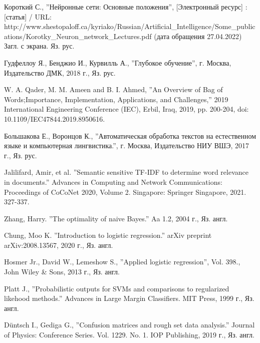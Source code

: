 \documentclass[bachelor, och, coursework]{SCWorks}
\begin{document}
\begin{thebibliography}{99}
     Короткий С., ''Нейронные сети: Основные положения'',
    [Электронный ресурс] : [статья] / URL:
    http://www.shestopaloff.ca/kyriako/Russian/Artificial_Intelligence/Some_publications/Korotky_Neuron_network_Lectures.pdf
    (дата обращения 27.04.2022) Загл. с экрана. Яз. рус.
    
     Гудфеллоу Я., Бенджио И., Курвилль А., ''Глубокое обучение'',
    г. Москва, Издательство ДМК, 2018 г., Яз. рус.
    
     W. A. Qader, M. M. Ameen and B. I. Ahmed, ''An Overview of Bag
    of Words;Importance, Implementation, Applications, and Challenges,'' 2019
    International Engineering Conference (IEC), Erbil, Iraq, 2019, pp. 200-204,
    doi: 10.1109/IEC47844.2019.8950616.


     Большакова Е., Воронцов К., ''Автоматическая обработка
    текстов на естественном языке и компьютерная лингвистика.'', г. Москва,
    Издательство НИУ ВШЭ, 2017 г., Яз. рус.

     Jalilifard, Amir, et al. ''Semantic sensitive TF-IDF to
    determine word relevance in documents.'' Advances in Computing and Network
    Communications: Proceedings of CoCoNet 2020, Volume 2. Singapore: Springer
    Singapore, 2021. 327-337.

     Zhang, Harry. ''The optimality of naive Bayes.'' Aa 1.2, 2004
    г., Яз. англ.

     Chung, Moo K. ''Introduction to logistic regression.''
    arXiv preprint arXiv:2008.13567, 2020 г., Яз. англ.

     Hosmer Jr., David W., Lemeshow S., ''Applied logistic
    regression'', Vol. 398., John Wiley \& Sons, 2013 г., Яз. англ.


     Platt J., ''Probabilistic outputs for SVMs and comparisons to
    regularized likehood methods.'' Advances in Large Margin Classifiers. MIT
    Press, 1999 г., Яз. англ.

     Düntsch I., Gediga G., ''Confusion matrices and rough set data
    analysis.'' Journal of Physics: Conference Series. Vol. 1229. No. 1. IOP
    Publishing, 2019 г., Яз. англ.


\end{thebibliography}
\end{document}
